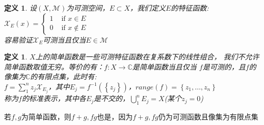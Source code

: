 \documentclass[12pt, a4paper, oneside]{ctexbook}
\newtheorem{definition}[theorem]{定义}
\begin{document}
\begin{definition}
    设$(X,\mathcal{M})$为可测空间，$E\subset X$，我们定义$E$的特征函数:\\
    $\mathcal{X}_E(x)=
    \begin{cases}
        1& \text{ if } x\in E \\
        0& \text{ if } x\notin E
      \end{cases}$\\
      容易验证$\mathcal{X}_E$可测当且仅当$E\in\mathcal{M}$
\end{definition}
\begin{definition}
    $X$上的简单函数是一些可测特征函数在复系数下的线性组合，
    我们不允许简单函数取值无穷。等价的有：$f:X\to\mathbb{C}$是简单函数当且仅当
    $f$是可测的，且$f$的像集为$\mathbb{C}$的有限点集，此时有:\\
    $f=\sum_1^nz_j\mathcal{X}_{E_j}$，其中$E_j=f^{-1}(\left\{z_j\right\})$，$range(f)=\left\{z_1,\dots,z_n\right\}$\\
    称为$f$的标准表示，其中各$E_j$是不交的，$\bigcup_1^nE_j=X$(某个$z_j=0$)
\end{definition}
若$f,g$为简单函数，则$f+g,fg$也是，因为$f+g,fg$仍为可测函数且像集为有限点集
\end{document}
